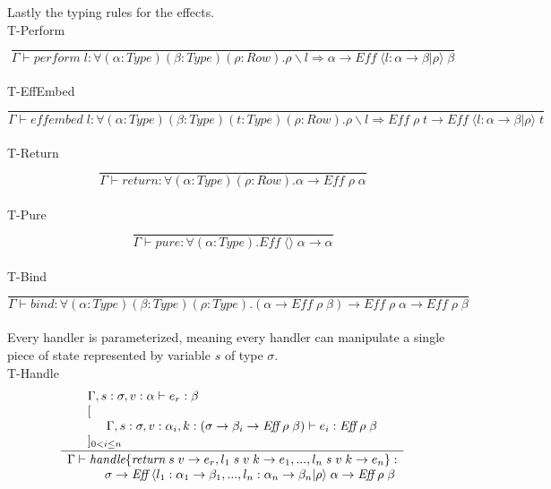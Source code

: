 \documentclass[12pt]{article}
\newcommand\llabel[0]{l}
\newcommand\tapp[2]{#1 \; #2} %
\newcommand\tappt[3]{\tapp{\tapp{#1}{#2}}{#3}} %
\newcommand\tarr[2]{#1 \rightarrow #2} %
\newcommand\tforalls[2]{\forall#1 . #2} %
\newcommand\tempty[0]{\langle\rangle} %
\newcommand\textend[3]{\langle#1:#2|#3\rangle} %
\newcommand\textendss[1]{\langle#1\rangle} %
\newcommand\ttype[0]{\textit{Type}} %
\newcommand\trow[0]{\textit{Row}} %
\newcommand\teff[0]{\textit{Eff}} %
\newcommand\clacks[2]{#1\backslash#2} %
\newcommand\timplies[2]{#1 \Rightarrow #2} %
\newcommand\term[0]{e} %
\newcommand\eperform[1]{\textit{perform} \; #1} %
\newcommand\eeffembed[1]{\textit{effembed} \; #1} %
\newcommand\ereturn[0]{\textit{return}} %
\newcommand\epure[0]{\textit{pure}} %
\newcommand\ebind[0]{\textit{bind}} %
\newcommand\ehandle[1]{\textit{handle}\{#1\}} %
\begin{document}
Lastly the typing rules for the effects.\\
T-Perform \[\frac{
	\begin{array}{l}
	\end{array}
}{
	\Gamma \vdash \eperform{\llabel} : \tforalls{(\alpha:\ttype)(\beta:\ttype)(\rho:\trow)}{\timplies{\clacks{\rho}{\llabel}}{\tarr{\alpha}{
\tappt{\teff}{\textend{\llabel}{\tarr{\alpha}{\beta}}{\rho}}{\beta}
}}}
}\]\\
T-EffEmbed \[\frac{
	\begin{array}{l}
	\end{array}
}{
	\Gamma \vdash \eeffembed{\llabel} :
	\tforalls{(\alpha:\ttype)(\beta:\ttype)(t:\ttype)(\rho:\trow)}{\timplies{\clacks{\rho}{\llabel}}{\tarr{\tappt{\teff}{\rho}{t}}{\tappt{\teff}{\textend{\llabel}{\tarr{\alpha}{\beta}}{\rho}}{t}}}}
}\]\\
T-Return \[\frac{
	\begin{array}{l}
	\end{array}
}{
	\Gamma \vdash \ereturn : \tforalls{(\alpha:\ttype)(\rho:\trow)}{\tarr{\alpha}{\tappt{\teff}{\rho}{\alpha}}}
}\]\\
T-Pure \[\frac{
	\begin{array}{l}
	\end{array}
}{
	\Gamma \vdash \epure : \tforalls{(\alpha:\ttype)}{\tarr{\tappt{\teff}{\tempty}{\alpha}}{\alpha}}
}\]\\
T-Bind \[\frac{
	\begin{array}{l}
	\end{array}
}{
	\Gamma \vdash \ebind : \tforalls{(\alpha:\ttype)(\beta:\ttype)(\rho:\ttype)}{\tarr{(\tarr{\alpha}{\tappt{\teff}{\rho}{\beta}})}{\tarr{\tappt{\teff}{\rho}{\alpha}}{\tappt{\teff}{\rho}{\beta}}}}
}\]\\
\newpage
Every handler is parameterized, meaning every handler can manipulate a single piece of state represented by variable $s$ of type $\sigma$.\\
T-Handle \[\frac{
	\begin{array}{l}
	\Gamma , s : \sigma, v : \alpha \vdash \term_r : \beta \\
	\lbrack \\
	\indent \Gamma , s : \sigma, v : \alpha_i, k : (\tarr{\sigma}{\tarr{\beta_i}{\tappt{\teff}{\rho}{\beta}}}) \vdash \term_i : \tappt{\teff}{\rho}{\beta} \\
	\rbrack_{0 < i \leq n}
	\end{array}
}{
	\begin{array}{l}
	\Gamma \vdash \ehandle{\ereturn\;s\;v \rightarrow \term_r, \llabel_1\;s\;v\;k \rightarrow \term_1, ..., \llabel_n\;s\;v\;k \rightarrow \term_n} :\\
	\indent\indent \tarr{\sigma}{\tarr{\tappt{\teff}{\textendss{\llabel_1 : \tarr{\alpha_1}{\beta_1}, ..., \llabel_n : \tarr{\alpha_n}{\beta_n} | \rho}}{\alpha}}{\tappt{\teff}{\rho}{\beta}}}
	\end{array}
}\]\\
\end{document}
